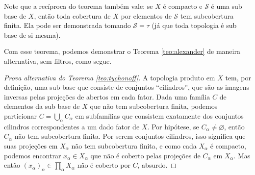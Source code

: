  Note que a recíproca do teorema também vale:
 se
 $X$
 é compacto e 
 $\mathcal{S}$
 é uma sub base de
 $X$,
 então toda cobertura de
 $X$
 por elementos de
 $\mathcal{S}$
 tem subcobertura finita.
 Ela pode ser demonstrada tomando
 $\mathcal{S} = \tau$
 (já que toda topologia é sub base de si mesma).
 
 Com esse teorema,
 podemos demonstrar o Teorema \ref{teo:alexander}
 de maneira alternativa, sem filtros, como segue.
 
 \begin{proof}[Prova alternativa do Teorema \ref{teo:tychonoff}]
 A topologia produto em
 $X$
 tem, por definição, uma sub base que consiste de
 conjuntos ``cilindros'', que são as imagens inversas
 pelas projeções de abertos em cada fator.
 Dada uma família
 $C$
 de elementos da sub base de
 $X$
 que não tem subcobertura finita,
 podemos particionar
 $C = \displaystyle{ \bigcup_{\alpha} C_{\alpha} }$
 em subfamílias que consistem exatamente dos conjuntos
 cilindros correspondentes a um dado fator de
 $X$.
 Por hipótese, se
 $C_{\alpha} \neq \varnothing$,
 então
 $C_{\alpha}$
 não tem subcobertura finita.
 Por serem conjuntos cilindros, isso significa que
 suas projeções em
 $X_{\alpha}$
 não tem subcobertura finita, e como cada
 $X_{\alpha}$
 é compacto, podemos encontrar
 $x_{\alpha} \in X_{\alpha}$
 que não é coberto pelas projeções de
 $C_{\alpha}$
 em
 $X_{\alpha}$.
 Mas então
 $(x_{\alpha})_{\alpha} \in \displaystyle{ \prod_{\alpha} X_{\alpha} }$
 não é coberto por
 $C$, 
 absurdo.
 \end{proof}